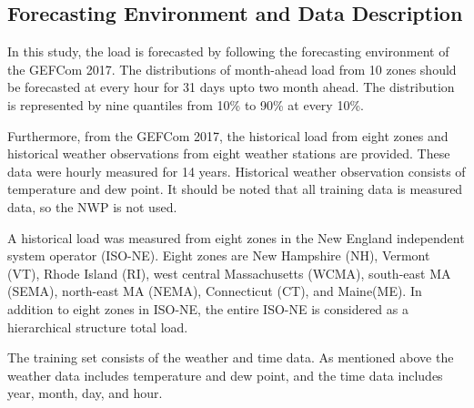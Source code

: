 \documentclass[journal]{IEEEtran} %
\begin{document}










\subsection{Forecasting Environment and Data Description}

In this study, the load is forecasted by following the forecasting environment of the GEFCom 2017. The distributions of month-ahead load from 10 zones should be forecasted at every hour for 31 days upto two month ahead. The distribution is represented by nine quantiles from 10\% to 90\% at every 10\%. 


Furthermore, from the GEFCom 2017, the historical load from eight zones and historical weather observations from eight weather stations are provided. These data were hourly measured for 14 years. Historical weather observation consists of temperature and dew point. It should be noted that all training data is measured data, so the NWP is not used. 

A historical load was measured from eight zones in the New England independent system operator (ISO-NE). Eight zones are New Hampshire (NH), Vermont (VT), Rhode Island (RI), west central Massachusetts (WCMA), south-east MA (SEMA), north-east MA (NEMA), Connecticut (CT), and Maine(ME). In addition to eight zones in ISO-NE, the entire ISO-NE is considered as a hierarchical structure total load.

The training set consists of the weather and time data. As mentioned above the weather data includes temperature and dew point, and the time data includes year, month, day, and hour. 
\end{document}
